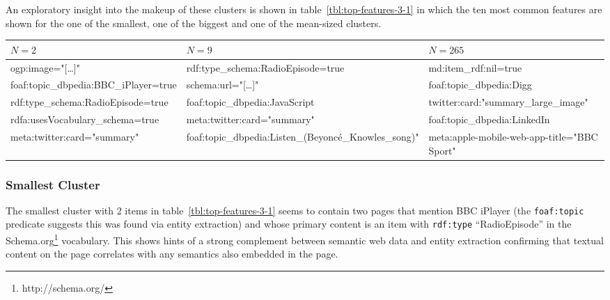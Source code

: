 An exploratory insight into the makeup of these clusters is shown
in table~\ref{tbl:top-features-3-1} in which the ten most common
features are shown for the one of the smallest, one of the biggest
and one of the mean-sized clusters.

\begin{sidewaystable}[p]
  \centering
  \renewcommand{\arraystretch}{1.5}
  \begin{tabular}{|l|l|l|}
    $N=2$                                 & $N=9$                                                   & $N=265$                                     \\
    \hline
    ogp:image="[\ldots]"                  & rdf:type\_schema:RadioEpisode=true                      & md:item\_rdf:nil=true                       \\
    foaf:topic\_dbpedia:BBC\_iPlayer=true & schema:url="[\ldots]"                                   & foaf:topic\_dbpedia:Digg                    \\
    rdf:type\_schema:RadioEpisode=true    & foaf:topic\_dbpedia:JavaScript                          & twitter:card:"summary\_large\_image"        \\
    rdfa:usesVocabulary\_schema=true      & meta:twitter:card="summary"                             & foaf:topic\_dbpedia:LinkedIn                \\
    meta:twitter:card="summary"           & foaf:topic\_dbpedia:Listen\_(Beyonc\'e\_Knowles\_song)" & meta:apple-mobile-web-app-title="BBC Sport" \\
  \end{tabular}
  \caption{Ten most common features across the smallest, the largest and a mean-sized cluster produced by the enriched union of dereference and entity extraction}
  \label{tbl:top-features-3-1}
\end{sidewaystable}

\subsubsection{Smallest Cluster}
\label{sec:smallest-cluster}

The smallest cluster with 2 items in table~\ref{tbl:top-features-3-1}
seems to contain two pages that mention BBC iPlayer (the
\texttt{foaf:topic} predicate suggests this was found via entity
extraction) and whose primary content is an item with \texttt{rdf:type}
``RadioEpisode'' in the Schema.org\footnote{http://schema.org/}
vocabulary. This shows hints of a strong complement between semantic
web data and entity extraction confirming that textual content on the
page correlates with any semantics also embedded in the page.

